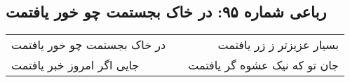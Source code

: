 \begin{center}
\section*{رباعی شماره ۹۵: در خاک بجستمت چو خور یافتمت}
\label{sec:sh095}
\begin{longtable}{l p{0.5cm} r}
در خاک بجستمت چو خور یافتمت
&&
بسیار عزیزتر ز زر یافتمت
\\
جایی اگر امروز خبر یافتمت
&&
جان تو که نیک عشوه گر یافتمت
\\
\end{longtable}
\end{center}
